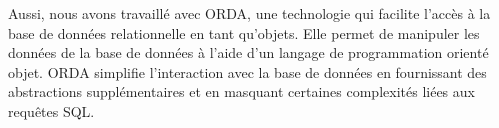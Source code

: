 Aussi, nous avons travaillé avec ORDA, une technologie qui facilite l’accès 
à la base de données 
relationnelle en tant qu’objets. 
Elle permet de manipuler les données de la base de données à l’aide d’un 
langage de programmation orienté objet. 
ORDA simplifie l’interaction avec la base de données en fournissant 
des abstractions supplémentaires et en masquant certaines complexités 
liées aux requêtes SQL.
\newline








